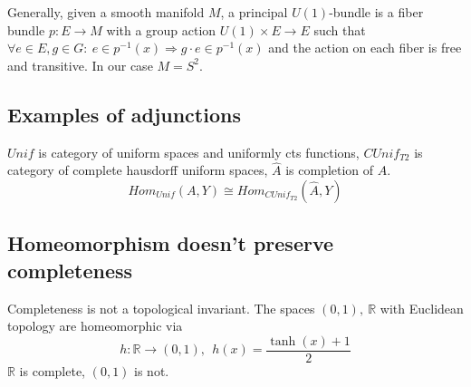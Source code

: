 \documentclass[12pt,a4paper]{article}
\renewcommand\:{\colon}
\begin{document}
Generally, given a smooth manifold $M$, a principal $U(1)$-bundle is a fiber bundle $p\: E\to M$ with a group action $U(1)\times E \to E$ such that $\forall e\in E, g\in G:\ e\in p^{-1}(x) \Rightarrow  g\cdot e \in p^{-1}(x)$ and the action on each fiber is free and transitive. In our case $M=S^{2}.$

\subsection{Examples of adjunctions}
$Unif$ is category of uniform spaces and uniformly cts functions, $CUnif_{T2}$ is category of complete hausdorff uniform spaces, $\hat{A}$ is completion of $A$. 
\begin{equation*}
	Hom_{Unif}(A,Y) \cong Hom_{CUnif_{T2}}(\hat{A} ,Y)
\end{equation*}

\subsection{Homeomorphism doesn't preserve completeness}
Completeness is not a topological invariant. The spaces $(0,1),\ \mathbb{R}$ with Euclidean topology are homeomorphic via
\begin{equation*}
  h\: \mathbb{R} \to (0,1), \ \ h(x) = \frac{\tanh(x)+1}{2}
\end{equation*}
$\mathbb{R}$ is complete, $(0,1)$ is not. 
\end{document}
